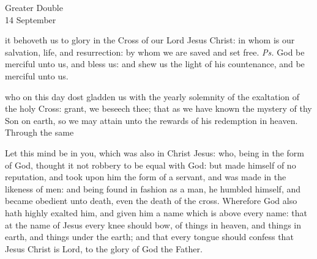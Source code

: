 \begin{inhead}
	{Greater Double\\
		14 September}
\end{inhead}
\par\noindent
{}
\par\noindent
{}

\introit
{} it behoveth us to glory in the Cross of our Lord Jesus Christ: in whom is our salvation, life, and resurrection: by whom we are saved and set free. \textit{Ps.} God be merciful unto us, and bless us: and shew us the light of his countenance, and be merciful unto us.

\collect
{} who on this day dost gladden us with the yearly solemnity of the exaltation of the holy Cross: grant, we beseech thee; that as we have known the mystery of thy Son on earth, so we may attain unto the rewards of his redemption in heaven. Through the same

 Let this mind be in you, which was also in Christ Jesus: who, being in the form of God, thought it not robbery to be equal with God: but made himself of no reputation, and took upon him the form of a servant, and was made in the likeness of men: and being found in fashion as a man, he humbled himself, and became obedient unto death, even the death of the cross. Wherefore God also hath highly exalted him, and given him a name which is above every name:  that at the name of Jesus every knee should bow, of things in heaven, and things in earth, and things under the earth; and that every tongue should confess that Jesus Christ is Lord, to the glory of God the Father.


